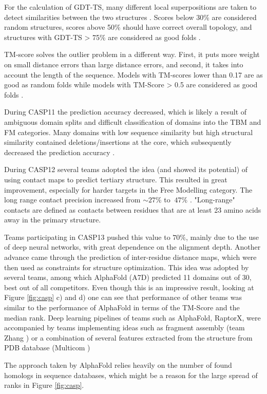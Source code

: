 For the calculation of GDT-TS, many different local superpositions are taken to detect similarities between the two structures \cite{gdt1}. 
Scores below 30\% are considered random structures, scores above 50\% should have correct overall topology, and structures with GDT-TS > 75\% are considered as good folds \cite{casp13}.

TM-score solves the outlier problem in a different way. 
First, it puts more weight on small distance errors than large distance errors, and second, it takes into account the length of the sequence. 
Models with TM-scores lower than 0.17 are as good as random folds while models with TM-Score > 0.5 are considered as good folds \cite{tmscore}.

During CASP11 the prediction accuracy decreased, which is likely a result of ambiguous domain splits and difficult classification of domains into the TBM and FM categories. 
Many domains with low sequence similarity but high structural similarity contained deletions/insertions at the core, which subsequently decreased the prediction accuracy \cite{casp11}.

During CASP12 several teams adopted the idea (and showed its potential) of using contact maps to predict tertiary structure. 
This resulted in great improvement, especially for harder targets in the Free Modelling category. 
The long range contact precision increased from $\sim 27\%$ to $~47\%$ \cite{casp12}. "Long-range" contacts are defined as contacts between residues that are at least 23 amino acids away in the primary structure. 

Teams participating in CASP13 pushed this value to $70\%$, mainly due to the use of deep neural networks, with great dependence on the alignment depth. 
Another advance came through the prediction of inter-residue distance maps, which were then used as constraints for structure optimization. 
This idea was adopted by several teams, among which AlphaFold (A7D) predicted 11 domains out of 30, best out of all competitors. 
Even though this is an impressive result, looking at Figure \ref{fig:casp} c) and d) one can see that performance of other teams was similar to the performance of AlphaFold in terms of the TM-Score and the median rank. 
Deep learning pipelines of teams such as AlphaFold, RaptorX, were accompanied by teams implementing ideas such as fragment assembly (team Zhang \cite{zhang}) or a combination of several features extracted from the structure from PDB database (Multicom \cite{multicom0})

The approach taken by AlphaFold relies heavily on the number of found homologs in sequence databases, which might be a reason for the large spread of ranks in Figure \ref{fig:casp}.
